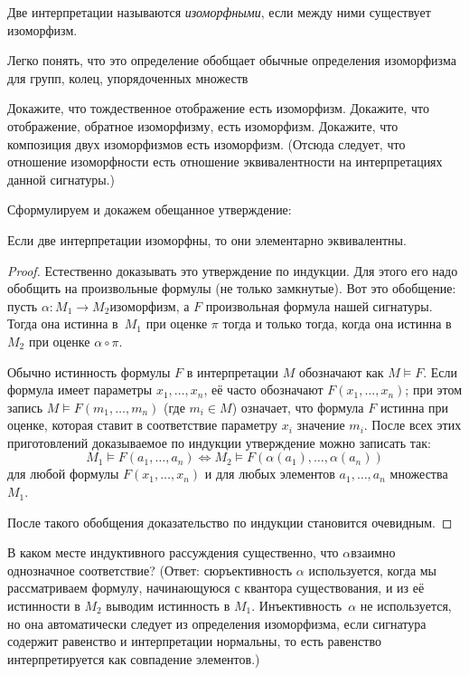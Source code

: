 Две интерпретации называются \emph{изоморфными}, если между ними
существует изоморфизм.

Легко понять, что это определение обобщает обычные определения
изоморфизма для групп, колец, упорядоченных множеств 


\begin{problem}
Докажите, что тождественное отображение есть изоморфизм.
Докажите, что отображение, обратное изоморфизму, есть
изоморфизм. Докажите, что композиция двух изоморфизмов
есть изоморфизм. (Отсюда следует, что отношение изоморфности
есть отношение эквивалентности на интерпретациях
данной сигнатуры.)
\end{problem}

Сформулируем и докажем обещанное утверждение:

\begin{theorem}
        \label{isomorphism-equivalence}
Если две интерпретации изоморфны, то они элементарно эквивалентны.
\end{theorem}

\begin{proof}
Естественно доказывать это утверждение по индукции. Для этого
его надо обобщить на произвольные формулы (не только замкнутые).
Вот это обобщение: пусть $\alpha\colon M_1\to M_2$\т изоморфизм,
а $F$ \т произвольная формула нашей сигнатуры. Тогда она истинна
в~$M_1$ при оценке $\pi$ тогда и только тогда, когда она истинна
в~$M_2$ при оценке $\alpha\circ\pi$.

Обычно истинность формулы $F$ в интерпретации $M$ обозначают как
$M\vDash F$. Если формула имеет параметры $x_1,\dots,x_n$, её
часто обозначают $F(x_1,\dots,x_n)$; при этом запись $M\vDash
F(m_1,\dots,m_n)$ (где $m_i\in M$) означает, что формула $F$
истинна при оценке, которая ставит в соответствие параметру
$x_i$ значение $m_i$. После всех этих приготовлений доказываемое
по индукции утверждение можно записать так:
        $$
M_1 \vDash F(a_1,\dots,a_n) \Leftrightarrow
M_2 \vDash F(\alpha(a_1),\dots,\alpha(a_n))
        $$
для любой формулы $F(x_1,\dots,x_n)$ и для любых элементов
$a_1,\dots,a_n$ множества~$M_1$.

После такого обобщения доказательство по индукции становится
очевидным.
\end{proof}

\begin{problem}
В каком месте индуктивного рассуждения существенно, что
$\alpha$\т взаимно однозначное соответствие? (Ответ:
сюръективность $\alpha$ используется, когда мы рассматриваем
формулу, начинающуюся с квантора существования, и из её
истинности в $M_2$ выводим истинность в $M_1$.
Инъективность~$\alpha$ не используется, но она автоматически следует из
определения изоморфизма, если сигнатура содержит равенство и
интерпретации нормальны,%
%
то есть равенство
интерпретируется как совпадение элементов.)
\end{problem}

